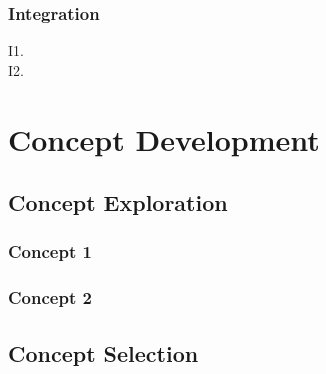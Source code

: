 \documentclass[10pt]{article}
\begin{document}
\subsubsection{Integration}
I1. \\ %
I2. %

\section{Concept Development} \label{sec:concept-development}

\subsection{Concept Exploration}

\subsubsection{Concept 1}

\subsubsection{Concept 2}


\subsection{Concept Selection} \label{sec:concept-selection}
\end{document}
